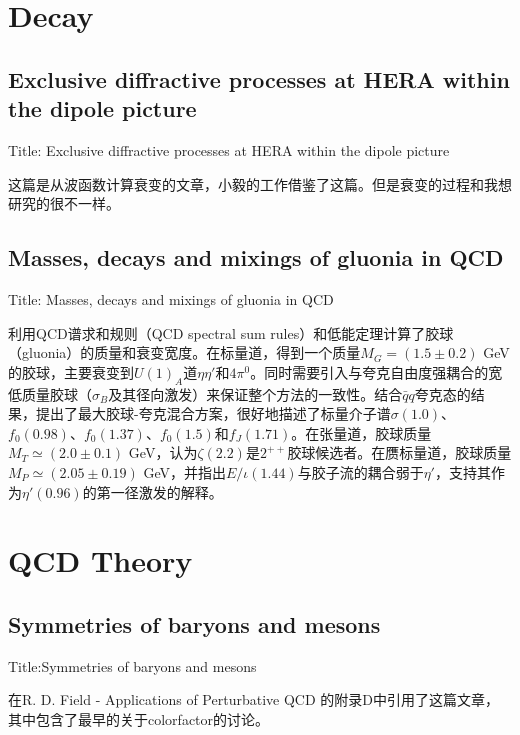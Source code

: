 \documentclass{article}
\begin{document}

\section{Decay}

\subsection{Exclusive diffractive processes at HERA within the dipole picture}

Title: \quad  Exclusive diffractive processes at HERA within the dipole picture \cite{Kowalski_2006}

这篇是从波函数计算衰变的文章，小毅的工作借鉴了这篇。但是衰变的过程和我想研究的很不一样。


\subsection{Masses, decays and mixings of gluonia in QCD}

Title: \quad Masses, decays and mixings of gluonia in QCD \cite{Narison_1997}

利用QCD谱求和规则（QCD spectral sum rules）和低能定理计算了胶球（gluonia）的质量和衰变宽度。在标量道，得到一个质量$M_G=(1.5\pm0.2)$ GeV的胶球，主要衰变到$U(1)_A$道$\eta\eta'$和$4\pi^0$。同时需要引入与夸克自由度强耦合的宽低质量胶球（$\sigma_B$及其径向激发）来保证整个方法的一致性。结合$\bar{q}q$夸克态的结果，提出了最大胶球-夸克混合方案，很好地描述了标量介子谱$\sigma(1.0)$、$f_0(0.98)$、$f_0(1.37)$、$f_0(1.5)$和$f_J(1.71)$。在张量道，胶球质量$M_T\simeq(2.0\pm0.1)$ GeV，认为$\zeta(2.2)$是$2^{++}$胶球候选者。在赝标量道，胶球质量$M_P\simeq(2.05\pm0.19)$ GeV，并指出$E/\iota(1.44)$与胶子流的耦合弱于$\eta'$，支持其作为$\eta'(0.96)$的第一径激发的解释。



\section{QCD Theory}

\subsection{Symmetries of baryons and mesons}
Title:Symmetries of baryons and mesons \cite{Gell-Mann:1962yej}

在R. D. Field - Applications of Perturbative QCD 的附录D中引用了这篇文章，其中包含了最早的关于colorfactor的讨论。
\end{document}
